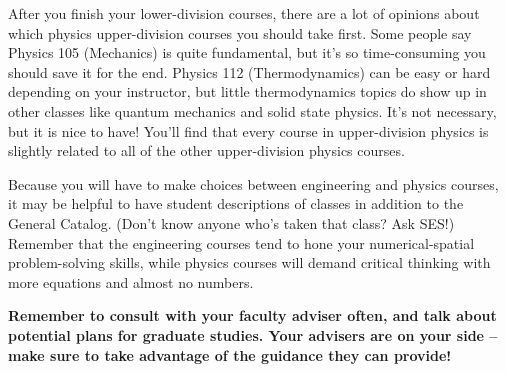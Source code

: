 After you finish your lower-division courses, there are a lot of opinions about which physics upper-division courses you should take first. Some people say Physics 105 (Mechanics) is quite fundamental, but it’s so time-consuming you should save it for the end. Physics 112 (Thermodynamics) can be easy or hard depending on your instructor, but little thermodynamics topics do show up in other classes like quantum mechanics and solid state physics. It’s not necessary, but it is nice to have! You’ll find that every course in upper-division physics is slightly related to all of the other upper-division physics courses.

Because you will have to make choices between engineering and physics courses, it may be helpful to have student descriptions of classes in addition to the General Catalog. (Don’t know anyone who’s taken that class? Ask SES!) Remember that the engineering courses tend to hone your numerical-spatial problem-solving skills, while physics courses will demand critical thinking with more equations and almost no numbers.

\textbf{Remember to consult with your faculty adviser often, and talk about potential plans for graduate studies. Your advisers are on your side – make sure to take advantage of the guidance they can provide!}

